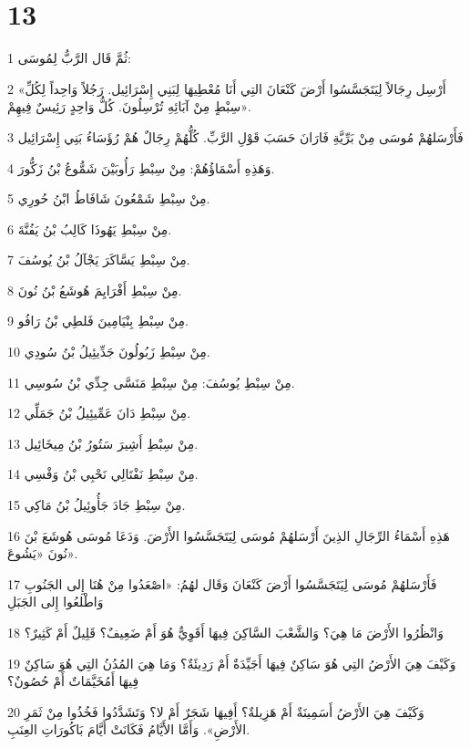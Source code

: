\chapter{13}

\par 1 ثُمَّ قَال الرَّبُّ لِمُوسَى:
\par 2 «أَرْسِل رِجَالاً لِيَتَجَسَّسُوا أَرْضَ كَنْعَانَ التِي أَنَا مُعْطِيهَا لِبَنِي إِسْرَائِيل. رَجُلاً وَاحِداً لِكُلِّ سِبْطٍ مِنْ آبَائِهِ تُرْسِلُونَ. كُلُّ وَاحِدٍ رَئِيسٌ فِيهِمْ».
\par 3 فَأَرْسَلهُمْ مُوسَى مِنْ بَرِّيَّةِ فَارَانَ حَسَبَ قَوْلِ الرَّبِّ. كُلُّهُمْ رِجَالٌ هُمْ رُؤَسَاءُ بَنِي إِسْرَائِيل
\par 4 وَهَذِهِ أَسْمَاؤُهُمْ: مِنْ سِبْطِ رَأُوبَيْنَ شَمُّوعُ بْنُ زَكُّورَ.
\par 5 مِنْ سِبْطِ شَمْعُونَ شَافَاطُ ابْنُ حُورِي.
\par 6 مِنْ سِبْطِ يَهُوذَا كَالِبُ بْنُ يَفُنَّةَ.
\par 7 مِنْ سِبْطِ يَسَّاكَرَ يَجْآلُ بْنُ يُوسُفَ.
\par 8 مِنْ سِبْطِ أَفْرَايِمَ هُوشَعُ بْنُ نُونَ.
\par 9 مِنْ سِبْطِ بِنْيَامِينَ فَلطِي بْنُ رَافُو.
\par 10 مِنْ سِبْطِ زَبُولُونَ جَدِّيئِيلُ بْنُ سُودِي.
\par 11 مِنْ سِبْطِ يُوسُفَ: مِنْ سِبْطِ مَنَسَّى جِدِّي بْنُ سُوسِي.
\par 12 مِنْ سِبْطِ دَانَ عَمِّيئِيلُ بْنُ جَمَلِّي.
\par 13 مِنْ سِبْطِ أَشِيرَ سَتُورُ بْنُ مِيخَائِيل.
\par 14 مِنْ سِبْطِ نَفْتَالِي نَحْبِي بْنُ وَفْسِي.
\par 15 مِنْ سِبْطِ جَادَ جَأُوئِيلُ بْنُ مَاكِي.
\par 16 هَذِهِ أَسْمَاءُ الرِّجَالِ الذِينَ أَرْسَلهُمْ مُوسَى لِيَتَجَسَّسُوا الأَرْضَ. وَدَعَا مُوسَى هُوشَعَ بْنَ نُونَ «يَشُوعَ».
\par 17 فَأَرْسَلهُمْ مُوسَى لِيَتَجَسَّسُوا أَرْضَ كَنْعَانَ وَقَال لهُمُ: «اصْعَدُوا مِنْ هُنَا إِلى الجَنُوبِ وَاطْلعُوا إِلى الجَبَلِ
\par 18 وَانْظُرُوا الأَرْضَ مَا هِيَ؟ وَالشَّعْبَ السَّاكِنَ فِيهَا أَقَوِيٌّ هُوَ أَمْ ضَعِيفٌ؟ قَلِيلٌ أَمْ كَثِيرٌ؟
\par 19 وَكَيْفَ هِيَ الأَرْضُ التِي هُوَ سَاكِنٌ فِيهَا أَجَيِّدَةٌ أَمْ رَدِيئَةٌ؟ وَمَا هِيَ المُدُنُ التِي هُوَ سَاكِنٌ فِيهَا أَمُخَيَّمَاتٌ أَمْ حُصُونٌ؟
\par 20 وَكَيْفَ هِيَ الأَرْضُ أَسَمِينَةٌ أَمْ هَزِيلةٌ؟ أَفِيهَا شَجَرٌ أَمْ لا؟ وَتَشَدَّدُوا فَخُذُوا مِنْ ثَمَرِ الأَرْضِ». وَأَمَّا الأَيَّامُ فَكَانَتْ أَيَّامَ بَاكُورَاتِ العِنَبِ.
